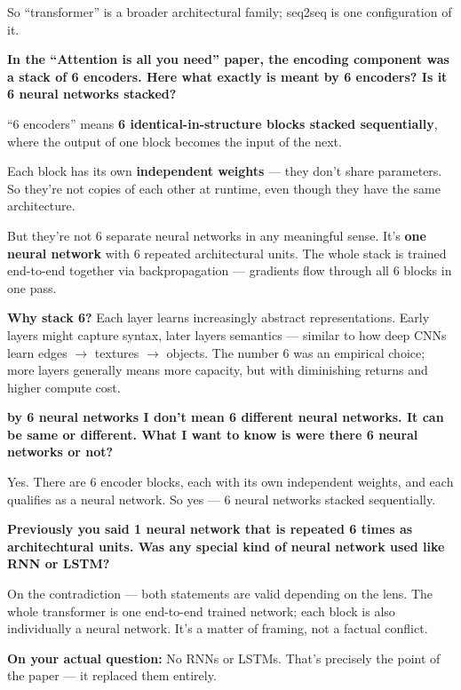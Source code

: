 So ``transformer'' is a broader architectural family; seq2seq is one configuration of it.

\medskip

\textbf{In the ``Attention is all you need'' paper, the encoding component was a stack of 6 encoders. Here what exactly is meant by 6 encoders? Is it 6 neural networks stacked?}

``6 encoders'' means \textbf{6 identical-in-structure blocks stacked sequentially}, where the output of one block becomes the input of the next.

Each block has its own \textbf{independent weights} --- they don't share parameters. So they're not copies of each other at runtime, even though they have the same architecture.

But they're not 6 separate neural networks in any meaningful sense. It's \textbf{one neural network} with 6 repeated architectural units. The whole stack is trained end-to-end together via backpropagation --- gradients flow through all 6 blocks in one pass.

\textbf{Why stack 6?} Each layer learns increasingly abstract representations. Early layers might capture syntax, later layers semantics --- similar to how deep CNNs learn edges $\rightarrow$ textures $\rightarrow$ objects. The number 6 was an empirical choice; more layers generally means more capacity, but with diminishing returns and higher compute cost.

\medskip

\textbf{by 6 neural networks I don't mean 6 different neural networks. It can be same or different. What I want to know is were there 6 neural networks or not?}

Yes. There are 6 encoder blocks, each with its own independent weights, and each qualifies as a neural network. So yes --- 6 neural networks stacked sequentially.

\medskip

\textbf{Previously you said 1 neural network that is repeated 6 times as architechtural units. Was any special kind of neural network used like RNN or LSTM?}

On the contradiction --- both statements are valid depending on the lens. The whole transformer is one end-to-end trained network; each block is also individually a neural network. It's a matter of framing, not a factual conflict.

\textbf{On your actual question:} No RNNs or LSTMs. That's precisely the point of the paper --- it replaced them entirely.

